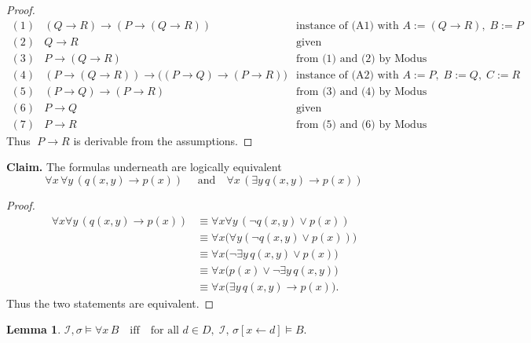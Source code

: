 \documentclass{article}
\theoremstyle{plain}
\newtheorem{lemma}{Lemma}
\theoremstyle{definition}
\theoremstyle{remark}
\begin{document}
\begin{proof}
\[
\begin{array}{rll}
(1) & (Q \to R) \to (P \to (Q \to R))
    & \text{instance of (A1) with } A := (Q \to R),\; B := P \\[2mm]

(2) & Q \to R
    & \text{given} \\[2mm]

(3) & P \to (Q \to R)
    & \text{from (1) and (2) by Modus Ponens} \\[2mm]

(4) & (P \to (Q \to R)) 
      \to \big((P \to Q) \to (P \to R)\big)
    & \text{instance of (A2) with } 
      A := P,\; B := Q,\; C := R \\[2mm]

(5) & (P \to Q) \to (P \to R)
    & \text{from (3) and (4) by Modus Ponens} \\[2mm]

(6) & P \to Q
    & \text{given} \\[2mm]

(7) & P \to R
    & \text{from (5) and (6) by Modus Ponens}
\end{array}
\]
Thus \(\;P \to R\) is derivable from the assumptions.
\end{proof}

\noindent\textbf{Claim.} The formulas underneath are logically equivalent
\[
\forall x\,\forall y\,(q(x,y)\to p(x))
\quad\text{ and}\quad
\forall x\,(\exists y\,q(x,y)\to p(x))
\]


\begin{proof}
\[
\begin{aligned}
\forall x\forall y\,(q(x,y)\to p(x))
&\equiv \forall x\forall y\,(\neg q(x,y)\lor p(x))\\
&\equiv \forall x\bigl(\forall y(\neg q(x,y)\lor p(x))\bigr)\\
&\equiv \forall x\bigl(\neg\exists y\,q(x,y)\lor p(x)\bigr)\\
&\equiv \forall x\bigl(p(x)\lor \neg\exists y\,q(x,y)\bigr)\\
&\equiv \forall x\bigl(\exists y\,q(x,y)\to p(x)\bigr).
\end{aligned}
\]
Thus the two statements are equivalent.
\end{proof}

\begin{lemma} 
$\mathcal{I},\sigma \vDash \forall x\, B
\quad\text{iff}\quad
\text{for all } d \in D,\;
\mathcal{I},\, \sigma[x \leftarrow d] \vDash B. $
\end{lemma}
\end{document}

